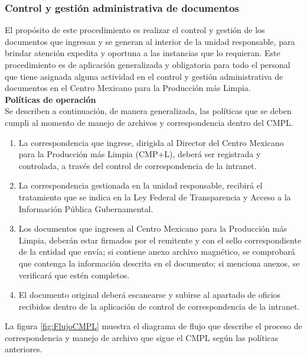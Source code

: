 		\subsubsection{Control y gestión administrativa de documentos}
	
	El propósito de este procedimiento es realizar el control y gestión de los documentos que ingresan y se generan al interior de la unidad responsable, para brindar atención expedita y oportuna a las instancias que lo requieran. Este procedimiento es de aplicación generalizada y obligatoria para todo el personal que tiene asignada alguna actividad en el control y gestión administrativa de documentos en el Centro Mexicano para la Producción más Limpia\cite{ManProcCMPL}.\\
	
		\textbf{Políticas de operación}\\
		
	Se describen a continuación, de manera generalizada, las políticas que se deben cumpli al momento de manejo de archivos y correspondencia dentro del CMPL.
		
		\begin{enumerate}
			\item La correspondencia que ingrese, dirigida al Director del Centro Mexicano para la Producción más Limpia (CMP+L), deberá ser registrada y controlada, a través del control de correspondencia de la intranet\cite{ManProcCMPL}.
			\item La correspondencia gestionada en la unidad responsable, recibirá el tratamiento que se indica en la Ley Federal de Transparencia y Acceso a la Información Pública Gubernamental\cite{ManProcCMPL}.
			\item Los documentos que ingresen al Centro Mexicano para la Producción más Limpia, deberán estar firmados por el remitente y con el sello correspondiente de la entidad que envía; si contiene anexo archivo magnético, se comprobará que contenga la información descrita en el documento; si menciona anexos, se verificará que estén completos\cite{ManProcCMPL}.
			\item El documento original deberá escanearse y subirse al apartado de oficios recibidos dentro de la aplicación de control de correspondencia de la intranet\cite{ManProcCMPL}.
		\end{enumerate}
		
	La figura \ref{fig:FlujoCMPL} muestra el diagrama de flujo que describe el proceso de correspondencia y manejo de archivo que sigue el CMPL según las políticas anteriores.		
		
